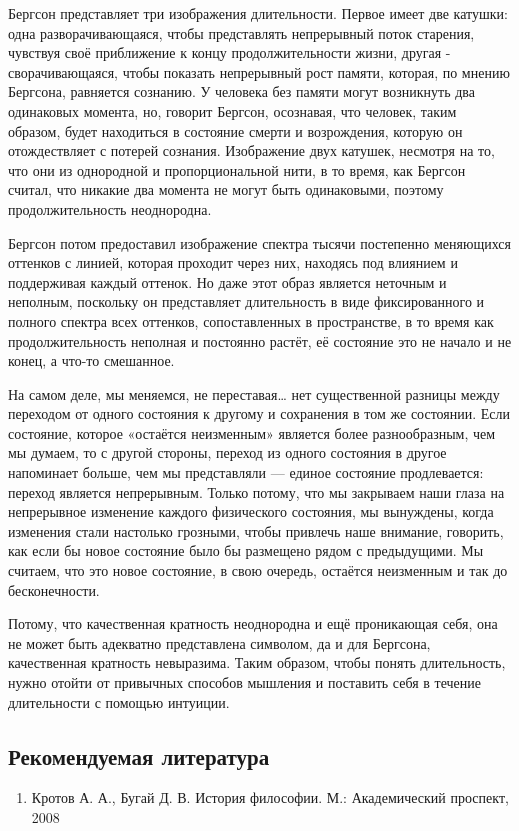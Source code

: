 \documentclass{article}
\begin{document}
\begin{flushleft}
Бергсон представляет три изображения длительности. Первое имеет две катушки: одна разворачивающаяся, чтобы представлять непрерывный поток старения, чувствуя своё приближение к концу продолжительности жизни, другая - сворачивающаяся, чтобы показать непрерывный рост памяти, которая, по мнению Бергсона, равняется сознанию. У человека без памяти могут возникнуть два одинаковых момента, но, говорит Бергсон, осознавая, что человек, таким образом, будет находиться в состояние смерти и возрождения, которую он отождествляет с потерей сознания. Изображение двух катушек, несмотря на то, что они из однородной и пропорциональной нити, в то время, как Бергсон считал, что никакие два момента не могут быть одинаковыми, поэтому продолжительность неоднородна.

Бергсон потом предоставил изображение спектра тысячи постепенно меняющихся оттенков с линией, которая проходит через них, находясь под влиянием и поддерживая каждый оттенок. Но даже этот образ является неточным и неполным, поскольку он представляет длительность в виде фиксированного и полного спектра всех оттенков, сопоставленных в пространстве, в то время как продолжительность неполная и постоянно растёт, её состояние это не начало и не конец, а что-то смешанное.

На самом деле, мы меняемся, не переставая… нет существенной разницы между переходом от одного состояния к другому и сохранения в том же состоянии. Если состояние, которое «остаётся неизменным» является более разнообразным, чем мы думаем, то с другой стороны, переход из одного состояния в другое напоминает больше, чем мы представляли — единое состояние продлевается: переход является непрерывным. Только потому, что мы закрываем наши глаза на непрерывное изменение каждого физического состояния, мы вынуждены, когда изменения стали настолько грозными, чтобы привлечь наше внимание, говорить, как если бы новое состояние было бы размещено рядом с предыдущими. Мы считаем, что это новое состояние, в свою очередь, остаётся неизменным и так до бесконечности.

Потому, что качественная кратность неоднородна и ещё проникающая себя, она не может быть адекватно представлена символом, да и для Бергсона, качественная кратность невыразима. Таким образом, чтобы понять длительность, нужно отойти от привычных способов мышления и поставить себя в течение длительности с помощью интуиции.

\subsection{Рекомендуемая литература}

\begin{enumerate}
    \item Кротов А. А., Бугай Д. В. История философии. М.: Академический проспект, 2008
\end{enumerate}

\end{flushleft}
\end{document}
